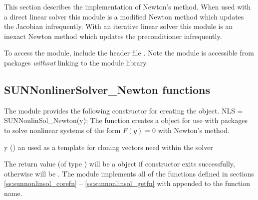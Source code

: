 This section describes the {\sundials} {\sunnonlinsol} implementation
of Newton's method. When used with a direct linear solver this module
is a modified Newton method which updates the Jacobian
infrequently. With an iterative linear solver this module is an
inexact Newton method which updates the preconditioner infrequently.

To access the {\sunnonlinsolnewton} module, include the header
file . Note the
{\sunnonlinsolnewton} module is accessible from {\sundials}
packages \textit{without} linking to the
 module library.


\subsection{SUNNonlinerSolver\_Newton functions}
\label{ss:sunnonlinsolnewton_functions}

The {\sunnonlinsolnewton} module provides the following constructor
for creating the  object.  
{
  NLS = SUNNonlinSol\_Newton(y);
}
{
  The function  creates a
   object for use with {\sundials} packages to
  solve nonlinear systems of the form $F(y) = 0$ with Newton's method.
}
{
  \begin{args}[y]
  \item[y] ()
    an  used as a template for cloning vectors need within
    the solver
  \end{args}
}
{
  The return value  (of type ) will be
  a {\sunnonlinsol} object if constructor exits successfully,
  otherwise  will be .
}
{}
The {\sunnonlinsolnewton} module implements all of the functions
defined in sections \ref{ss:sunnonlinsol_corefn} -- 
\ref{ss:sunnonlinsol_getfn} with  appended to the
function name.

